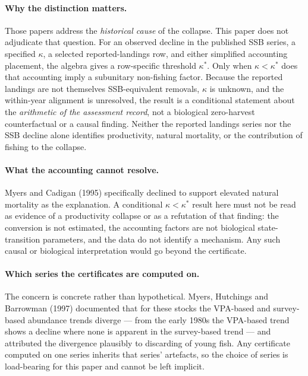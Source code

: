 \documentclass[10pt,twocolumn]{article}
\theoremstyle{plain}
\theoremstyle{remark}
\begin{document}
\paragraph{Why the distinction matters.} Those papers address the
\emph{historical cause} of the collapse. This paper does not adjudicate
that question. For an observed decline in the published SSB series, a
specified \(\kappa\), a selected reported-landings row, and either
simplified accounting placement, the algebra gives a row-specific
threshold \(\kappa^*\). Only when \(\kappa<\kappa^*\) does that
accounting imply a subunitary non-fishing factor. Because the reported
landings are not themselves SSB-equivalent removals, \(\kappa\) is
unknown, and the within-year alignment is unresolved, the result is a
conditional statement about the \emph{arithmetic of the assessment
record}, not a biological zero-harvest counterfactual or a causal
finding. Neither the reported landings series nor the SSB decline alone
identifies productivity, natural mortality, or the contribution of
fishing to the collapse.

\paragraph{What the accounting cannot resolve.} Myers and Cadigan
(1995) specifically declined to support elevated natural mortality as
the explanation. A conditional \(\kappa<\kappa^*\) result here must not
be read as evidence of a productivity collapse or as a refutation of
that finding: the conversion is not estimated, the accounting factors
are not biological state-transition parameters, and the data do not
identify a mechanism. Any such causal or biological interpretation
would go beyond the certificate.

\paragraph{Which series the certificates are computed on.} The concern is concrete rather
than hypothetical. Myers, Hutchings and Barrowman (1997) documented that for these stocks the
VPA-based and survey-based abundance trends diverge --- from the early 1980s the VPA-based
trend shows a decline where none is apparent in the survey-based trend --- and attributed the
divergence plausibly to discarding of young fish. Any certificate computed on one series
inherits that series' artefacts, so the choice of series is load-bearing for this paper and
cannot be left implicit.
\end{document}
